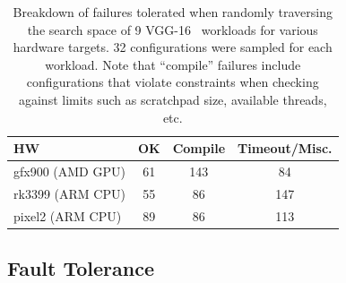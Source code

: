 

\begin{table}[t]
\centering
\begin{tabular}{l|c|c|c}
\hline
HW&OK&Compile&Timeout/Misc.\\
\hline
gfx900 (AMD GPU)&61&143&84\\
rk3399 (ARM CPU)&55&86&147\\
pixel2 (ARM CPU)&89&86&113\\
\end{tabular}
\caption{Breakdown of failures tolerated when randomly traversing the search space of 9 VGG-16~\cite{simonyan2014very} workloads for various hardware targets.
32 configurations were sampled for each workload. Note that ``compile'' failures include configurations that violate constraints when checking against limits such as scratchpad size, available threads, etc.}\label{tbl:fault_tolerance}
\end{table}


\subsection{Fault Tolerance}

